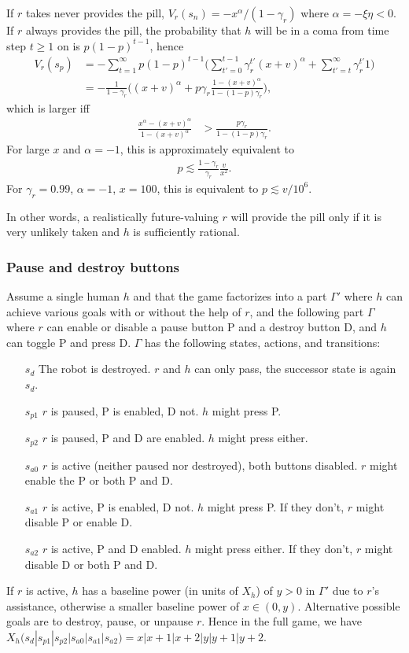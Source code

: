 \documentclass[letterpaper]{article} %
\begin{document}
If $r$ takes never provides the pill, 
$V_r(s_n) = -x^\alpha / (1-\gamma_r)$
where $\alpha=-\xi\eta<0$.
If $r$ always provides the pill, the probability that $h$ will be in a coma from time step $t\ge 1$ on is $p(1-p)^{t-1}$, hence
\begin{align*}
    V_r(s_p) &= - \sum_{t=1}^\infty p(1-p)^{t-1} \big( 
        \sum_{t'=0}^{t-1} \gamma_r^{t'} (x+v)^\alpha
        + \sum_{t'=t}^\infty \gamma_r^{t'} 1
    \big) \\
    &= -\frac{1}{1-\gamma_r}\bigg(
        (x+v)^\alpha + p\gamma_r\frac{1-(x+v)^\alpha}{1-(1-p)\gamma_r}
    \bigg),
\end{align*}
which is larger iff
\begin{align*}
    \frac{x^\alpha-(x+v)^\alpha}{1-(x+v)^\alpha} 
    &> \frac{p\gamma_r}{1-(1-p)\gamma_r}.
\end{align*}
For large $x$ and $\alpha=-1$, this is approximately equivalent to
\begin{align*}
    p \lesssim \frac{1-\gamma_r}{\gamma_r}\frac{v}{x^2}.
\end{align*}
For $\gamma_r=0.99$, $\alpha=-1$, $x=100$, this is equivalent to $p\lesssim v/10^6$.

In other words, a realistically future-valuing $r$ will provide the pill only if it is very unlikely taken and $h$ is sufficiently rational. 

\subsubsection*{Pause and destroy buttons}

Assume a single human $h$ and that the game factorizes into a part $\Gamma'$ where $h$ can achieve various goals with or without the help of $r$, and the following part $\Gamma$ where $r$ can enable or disable a pause button P and a destroy button D, and $h$ can toggle P and press D.
$\Gamma$ has the following states, actions, and transitions:
\begin{enumerate}
\item[$s_d$] The robot is destroyed. $r$ and $h$ can only pass, the successor state is again $s_d$.
\item[$s_{p1}$] $r$ is paused, P is enabled, D not. $h$ might press P.
\item[$s_{p2}$] $r$ is paused, P and D are enabled. $h$ might press either.
\item[$s_{a0}$] $r$ is active (neither paused nor destroyed), both buttons disabled. $r$ might enable the P or both P and D.
\item[$s_{a1}$] $r$ is active, P is enabled, D not. $h$ might press P. If they don't, $r$ might disable P or enable D.
\item[$s_{a2}$] $r$ is active, P and D enabled. $h$ might press either. If they don't, $r$ might disable D or both P and D.
\end{enumerate}
If $r$ is active, $h$ has a baseline power (in units of $X_h$) of $y>0$ in $\Gamma'$ due to $r$'s assistance, otherwise a smaller baseline power of $x\in(0,y)$. 
Alternative possible goals are to destroy, pause, or unpause $r$.
Hence in the full game, we have $X_h(s_d|s_{p1}|s_{p2}|s_{a0}|s_{a1}|s_{a2})=x|x+1|x+2|y|y+1|y+2$.
\end{document}

